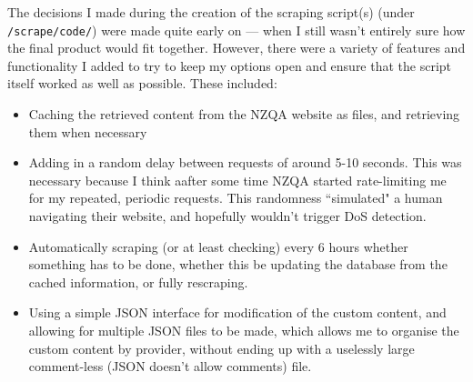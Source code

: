 \documentclass{article}
\begin{document}
The decisions I made during the creation of the scraping script(s) (under \texttt{/scrape/code/}) were made quite early on --- when I still wasn't entirely sure how the final product would fit together. However, there were a variety of features and functionality I added to try to keep my options open and ensure that the script itself worked as well as possible. These included:
\begin{itemize}
    \item Caching the retrieved content from the NZQA website as files, and retrieving them when necessary
    \item Adding in a random delay between requests of around 5-10 seconds. This was necessary because I think aafter some time NZQA started rate-limiting me for my repeated, periodic requests. This randomness ``simulated" a human navigating their website, and hopefully wouldn't trigger DoS detection.
    \item Automatically scraping (or at least checking) every 6 hours whether something has to be done, whether this be updating the database from the cached information, or fully rescraping.
    \item Using a simple JSON interface for modification of the custom content, and allowing for multiple JSON files to be made, which allows me to organise the custom content by provider, without ending up with a uselessly large comment-less (JSON doesn't allow comments) file.
\end{itemize}
\end{document}
